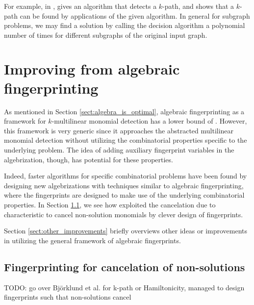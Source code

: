 For example, in \cite{Koutis08}, 
\cite{Koutis08} gives an algorithm that detects a $k$-path, and shows that a 
$k$-path can be found by  applications of the given
algorithm. 
In general for subgraph problems, we may find a solution by calling the decision 
algorithm a polynomial number of times for different subgraphs of the original input graph.

\section{Improving from algebraic fingerprinting}
\label{sect:improvements}

As mentioned in Section \ref{sect:algebra_is_optimal}, 
algebraic fingerprinting as a framework %
for $k$-multilinear monomial detection has a lower bound of . 
However, this framework is very generic since it 
approaches the abstracted multilinear monomial detection without 
utilizing the combinatorial properties specific to the underlying problem. 
The idea of adding auxiliary fingerprint variables in the algebrization, though, 
has potential for these properties.

Indeed, faster algorithms for specific combinatorial problems 
have been found by designing new algebrizations with techniques 
similar to algebraic fingerprinting, where the fingerprints are designed to make use of 
the underlying combinatorial properties. In Section \ref{sect:cancel_nonsolutions}, 
we see how \citeauthor{Björklund14} \cite{Björklund14} 
exploited the cancelation due to characteristic to cancel non-solution monomials 
by clever design of fingerprints. 

Section \ref{sect:other_improvements} briefly overviews other ideas or 
improvements in utilizing the general framework of algebraic fingerprints.

\subsection{Fingerprinting for cancelation of non-solutions}
\label{sect:cancel_nonsolutions}

TODO: go over Björklund et al. for k-path or Hamiltonicity, managed to design
fingerprints such that non-solutions cancel

